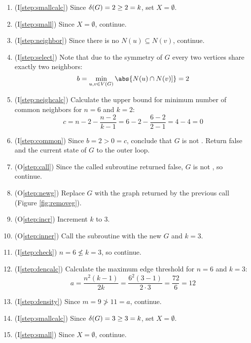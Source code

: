 \begin{enumerate}
\item (I\ref{step:smallcalc}) Since \(\delta(G)=2\ge2=k\), set \(X=\emptyset\).

\item (I\ref{step:small}) Since \(X=\emptyset\), continue.

\item (I\ref{step:neighbor}) Since there is no \(N(u)\subseteq N(v)\), continue.

\item (I\ref{step:select}) Note that due to the symmetry of \(G\) every two vertices share exactly two neighbors:
  \[b=\min_{u,v\in V(G)}\abs{N(u)\cap N(v)]}=2\]

\item (I\ref{step:neighcalc}) Calculate the upper bound for minimum number of common neighbors for \(n=6\) and
  \(k=2\):
  \[c=n-2-\frac{n-2}{k-1}=6-2-\frac{6-2}{2-1}=4-4=0\]

\item (I\ref{step:common}) Since \(b=2>0=c\), conclude that \(G\) is not .  Return false and the current
  state of \(G\) to the outer loop.

\item (O\ref{step:call}) Since the called subroutine returned false, \(G\) is not , so continue.

\item (O\ref{step:newg}) Replace \(G\) with the graph returned by the previous call (Figure \ref{fig:removeg}).

\item (O\ref{step:incr}) Increment \(k\) to 3.

\item (O\ref{step:inner}) Call the subroutine with the new \(G\) and \(k=3\).
  
\item (I\ref{step:check}) \(n=6\nleq k=3\), so continue.

\item (I\ref{step:dencalc}) Calculate the maximum edge threshold for \(n=6\) and \(k=3\):
  \[a=\frac{n^2(k-1)}{2k}=\frac{6^2(3-1)}{2\cdot3}=\frac{72}{6}=12\]

\item (I\ref{step:density}) Since \(m=9\ngtr11=a\), continue.

\item (I\ref{step:smallcalc}) Since \(\delta(G)=3\ge3=k\), set \(X=\emptyset\).

\item (I\ref{step:small}) Since \(X=\emptyset\), continue.


\end{enumerate}
